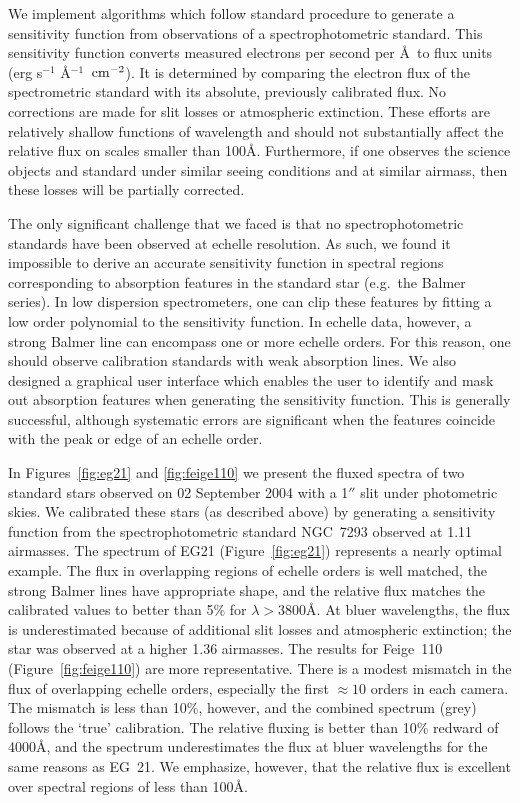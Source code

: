 \documentclass[12pt,preprint]{aastex}
\begin{document}
We implement algorithms which follow standard procedure to 
generate a sensitivity function from observations of a spectrophotometric
standard.  This sensitivity function converts measured electrons per
second per \AA\ to flux units (erg s$^{-1}$ \AA$^{-1}$ $\, {\rm cm^{-2}}$).
It is determined by comparing the electron flux of the spectrometric
standard with its absolute, previously calibrated flux.
No corrections are made for slit losses or atmospheric extinction.
These efforts are relatively shallow functions of wavelength and should
not substantially affect the relative flux on scales smaller than 100\AA.
Furthermore,
if one observes the science objects and standard under similar seeing
conditions and at similar airmass, then these losses will be 
partially corrected.

The only significant challenge that we faced is that no spectrophotometric
standards have been observed at echelle resolution.  
As such, we found it impossible to derive an accurate sensitivity 
function in spectral regions corresponding to
absorption features in the standard star (e.g.\ the Balmer series).
In low dispersion spectrometers, one can clip these features
by fitting a low order polynomial to the sensitivity function. 
In echelle data, however, a strong Balmer
line can encompass one or more echelle orders.   For this reason,
one should observe calibration standards with weak
absorption lines.  We also designed a graphical user interface
which enables the user to identify and mask out absorption features
when generating the sensitivity function.  This is generally 
successful, although systematic errors are significant when the
features coincide with the peak or edge of an echelle order.

In Figures~\ref{fig:eg21} and \ref{fig:feige110}
we present the fluxed spectra of two standard stars observed
on 02 September 2004 with a 1$''$ slit under photometric skies.
We calibrated these stars (as described above) by generating
a sensitivity function from the spectrophotometric standard
NGC~7293 observed at 1.11 airmasses.
The spectrum of EG21 (Figure~\ref{fig:eg21}) represents
a nearly optimal example.  The flux in overlapping regions of
echelle orders is well matched, the strong Balmer lines have 
appropriate shape, and the relative flux matches the 
calibrated values \citep{hamuy94} to better than 5$\%$ for
$\lambda > 3800$\AA.  At bluer wavelengths, the flux is underestimated
because of additional slit losses and atmospheric 
extinction;  the star was observed at a higher 1.36 airmasses.
The results for Feige~110 (Figure~\ref{fig:feige110}) are more
representative.  There is a modest mismatch
in the flux of overlapping echelle orders, especially the
first $\approx 10$ orders in each camera.  The mismatch is less
than 10$\%$, however, and the combined spectrum (grey) follows
the `true' calibration.  The relative fluxing is better than 10$\%$
redward of 4000\AA, and the spectrum underestimates the
flux at bluer wavelengths for the same reasons as EG~21.
We emphasize, however, that the relative flux is excellent over
spectral regions of less than 100\AA.
\end{document}
